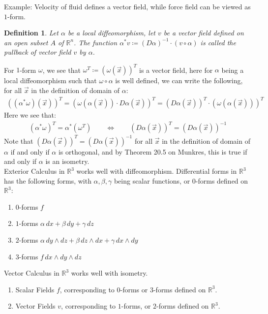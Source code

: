 \documentclass[11pt,oneside]{book}
\theoremstyle{break}
\theoremstyle{break}
\newtheorem{defn}{Definition}[corL]
\newcommand{\R}{\mathbb{R}}
\newcommand{\example}{\color{green}Example: \color{black}}
\begin{document}
\example 
Velocity of fluid defines a vector field, while force field can be viewed as $1$-form.

\begin{defn}
Let $\alpha$ be a local diffeomorphism, let $v$ be a vector field defined on an open subset $A$ of $\R^n$. The function $\alpha^*v \coloneqq (D\alpha)^{-1} \cdot (v\circ \alpha)$ is called the pullback of vector field $v$ by $\alpha$. 
\end{defn}

For $1$-form $\omega$, we see that $\omega^T\coloneqq \left(\omega(\vec{x})\right)^T$ is a vector field, here for $\alpha$ being a local diffeomorphism such that $\omega \circ \alpha$ is well defined, we can write the following, for all $\vec{x}$ in the definition of domain of $\alpha$:
\begin{align*}
((\alpha^*\omega)(\vec{x}))^T = (\omega(\alpha(\vec{x})) \cdot D\alpha(\vec{x}))^T = (D\alpha(\vec{x}))^T \cdot (\omega(\alpha(\vec{x})))^T 
\end{align*}
Here we see that:
\begin{align*}
(\alpha^*\omega)^T = \alpha^*(\omega^T)\qquad \iff \qquad (D\alpha(\vec{x}))^T = (D\alpha(\vec{x}))^{-1}
\end{align*}
Note that $(D\alpha(\vec{x}))^T = (D\alpha(\vec{x}))^{-1}$ for all $\vec{x}$ in the definition of domain of $\alpha$ if and only if $\alpha$ is orthogonal, and by Theorem 20.5 on Munkres, this is true if and only if $\alpha$ is an isometry.\\


Exterior Calculus in $\R^3$ works well with diffeomorphism. Differential forms in $\R^3$ has the following forms, with $\alpha,\beta,\gamma$ being scalar functions, or $0$-forms defined on $\R^3$:
\begin{enumerate}[topsep=3pt,itemsep=-1ex,partopsep=1ex,parsep=1ex]
\item $0$-forms $f$
\item $1$-forms $\alpha\, dx + \beta\, dy + \gamma\, dz$
\item $2$-forms $\alpha\, dy \wedge dz + \beta \, dz\wedge dx + \gamma\, dx\wedge dy$
\item $3$-forms $f \, dx \wedge dy\wedge dz$
\end{enumerate}

Vector Calculus in $\R^3$ works well with isometry.
\begin{enumerate}[topsep=3pt,itemsep=-1ex,partopsep=1ex,parsep=1ex]
\item Scalar Fields $f$, corresponding to $0$-forms or $3$-forms defined on $\R^3$.
\item Vector Fields $v$, corresponding to $1$-forms, or $2$-forms defined on $\R^3$. 
\end{enumerate}
\end{document}
